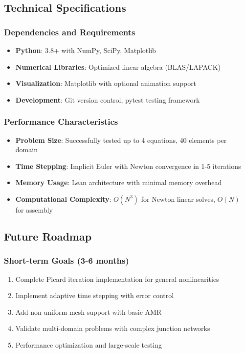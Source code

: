 \subsection{Technical Specifications}

\subsubsection{Dependencies and Requirements}
\begin{itemize}
    \item \textbf{Python}: 3.8+ with NumPy, SciPy, Matplotlib
    \item \textbf{Numerical Libraries}: Optimized linear algebra (BLAS/LAPACK)
    \item \textbf{Visualization}: Matplotlib with optional animation support
    \item \textbf{Development}: Git version control, pytest testing framework
\end{itemize}

\subsubsection{Performance Characteristics}
\begin{itemize}
    \item \textbf{Problem Size}: Successfully tested up to 4 equations, 40 elements per domain
    \item \textbf{Time Stepping}: Implicit Euler with Newton convergence in 1-5 iterations
    \item \textbf{Memory Usage}: Lean architecture with minimal memory overhead
    \item \textbf{Computational Complexity}: $O(N^3)$ for Newton linear solves, $O(N)$ for assembly
\end{itemize}

\subsection{Future Roadmap}

\subsubsection{Short-term Goals (3-6 months)}
\begin{enumerate}
    \item Complete Picard iteration implementation for general nonlinearities
    \item Implement adaptive time stepping with error control
    \item Add non-uniform mesh support with basic AMR
    \item Validate multi-domain problems with complex junction networks
    \item Performance optimization and large-scale testing
\end{enumerate}

